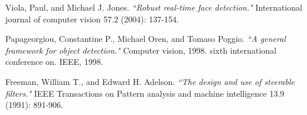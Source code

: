 \documentclass[10pt,a4paper]{report}
\begin{document}
\begin{thebibliography}{9}

Viola, Paul, and Michael J. Jones. \emph{``Robust real-time face detection."} International journal of computer vision 57.2 (2004): 137-154.

Papageorgiou, Constantine P., Michael Oren, and Tomaso Poggio. \emph{``A general framework for object detection."} Computer vision, 1998. sixth international conference on. IEEE, 1998.

Freeman, William T., and Edward H. Adelson. \emph{``The design and use of steerable filters."} IEEE Transactions on Pattern analysis and machine intelligence 13.9 (1991): 891-906.

\end{thebibliography}
\end{document}
